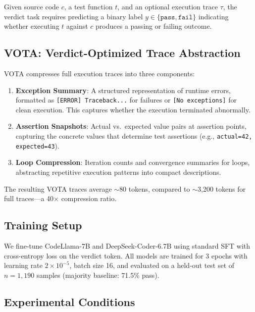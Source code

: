 \documentclass[11pt,a4paper]{article}
\begin{document}
Given source code $c$, a test function $t$, and an optional execution trace $\tau$, the verdict task requires predicting a binary label $y \in \{\texttt{pass}, \texttt{fail}\}$ indicating whether executing $t$ against $c$ produces a passing or failing outcome.

\subsection{VOTA: Verdict-Optimized Trace Abstraction}

VOTA compresses full execution traces into three components:

\begin{enumerate}
\item \textbf{Exception Summary}: A structured representation of runtime errors, formatted as \texttt{[ERROR] Traceback...} for failures or \texttt{[No exceptions]} for clean execution. This captures whether the execution terminated abnormally.
\item \textbf{Assertion Snapshots}: Actual vs.\ expected value pairs at assertion points, capturing the concrete values that determine test assertions (e.g., \texttt{actual=42, expected=43}).
\item \textbf{Loop Compression}: Iteration counts and convergence summaries for loops, abstracting repetitive execution patterns into compact descriptions.
\end{enumerate}

The resulting VOTA traces average $\sim$80 tokens, compared to $\sim$3,200 tokens for full traces---a 40$\times$ compression ratio.

\subsection{Training Setup}

We fine-tune CodeLlama-7B \cite{roziere2023code} and DeepSeek-Coder-6.7B \cite{guo2024deepseek} using standard SFT with cross-entropy loss on the verdict token.
All models are trained for 3 epochs with learning rate $2 \times 10^{-5}$, batch size 16, and evaluated on a held-out test set of $n = 1{,}190$ samples (majority baseline: 71.5\% pass).

\subsection{Experimental Conditions}
\end{document}
